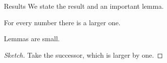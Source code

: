 \documentclass{beamer}
\begin{document}
\begin{frame}{Results}
We state the  result and an \alert{important }lemma.
\begin{theorem}[Main]
For every number there is a larger one.
\end{theorem}
\begin{lemma}
Lemmas are small.
\end{lemma}
\begin{proof}[Sketch]
Take the successor, which is larger by one.
\end{proof}
\end{frame}
\end{document}
